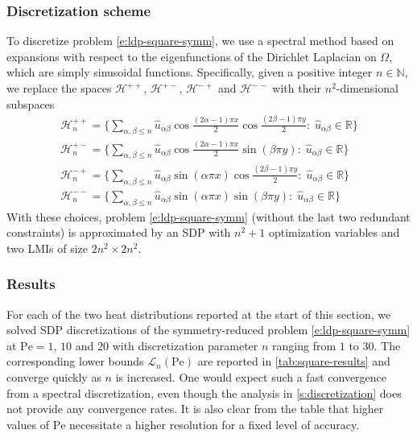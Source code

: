 \documentclass[a4paper, 10pt]{amsart}
\numberwithin{equation}{section}
\theoremstyle{plain}
\theoremstyle{definition}
\theoremstyle{remark}
\newcommand{\cal}[1]{\mathcal{#1}}
\newcommand{\R}{\mathbb{R}}
\newcommand{\N}{\mathbb{N}}
\newcommand{\Pe}{\mathrm{Pe}}
\newcommand{\Hpp}{\cal{H}^{++}}
\newcommand{\Hpm}{\cal{H}^{+-}}
\newcommand{\Hmp}{\cal{H}^{-+}}
\newcommand{\Hmm}{\cal{H}^{--}}
\newcommand{\lb}{\mathcal{L}}
\begin{document}
\subsubsection{Discretization scheme}
To discretize problem \cref{e:ldp-square-symm}, we use a spectral method based on expansions with respect to the eigenfunctions of the Dirichlet Laplacian on $\Omega$, which are simply sinusoidal functions. Specifically, given a positive integer $n\in \N$, we replace the spaces $\Hpp$, $\Hpm$, $\Hmp$ and $\Hmm$ with their $n^2$-dimensional subspaces
\begin{gather*}
    \Hpp_n = \bigg\{
        \sum_{\alpha,\beta\leq n} 
            \hat{u}_{\alpha\beta}
            \cos\tfrac{(2\alpha-1) \pi x}{2}
            \cos\tfrac{(2\beta-1) \pi y}{2}
            :\; \hat{u}_{\alpha\beta} \in \R
        \bigg\}
    \\
    \Hpm_n = \bigg\{
        \sum_{\alpha,\beta\leq n} 
            \hat{u}_{\alpha\beta}
            \cos\tfrac{(2\alpha-1) \pi x}{2}
            \sin\left(\beta \pi y\right)
            :\; \hat{u}_{\alpha\beta} \in \R
        \bigg\}
    \\
    \Hmp_n = \bigg\{
        \sum_{\alpha,\beta\leq n} 
            \hat{u}_{\alpha\beta}
            \sin\left(\alpha \pi x\right)
            \cos\tfrac{(2\beta-1) \pi y}{2}
            :\; \hat{u}_{\alpha\beta} \in \R
        \bigg\}
    \\
    \Hmm_n = \bigg\{
        \sum_{\alpha,\beta\leq n} 
            \hat{u}_{\alpha\beta}
            \sin\left(\alpha \pi x\right)
            \sin\left(\beta \pi y\right)
            :\; \hat{u}_{\alpha\beta} \in \R
        \bigg\}
\end{gather*}
With these choices, problem \cref{e:ldp-square-symm} (without the last two redundant constraints) is approximated by an SDP with $n^2+1$ optimization variables and two LMIs of size $2n^2 \times 2n^2$.

\subsubsection{Results}
For each of the two heat distributions reported at the start of this section, we solved SDP discretizations of the symmetry-reduced problem \cref{e:ldp-square-symm} at $\Pe=1$, $10$ and $20$ with discretization parameter $n$ ranging from $1$ to $30$. The corresponding lower bounds $\lb_n(\Pe)$ are reported in \cref{tab:square-results} and converge quickly as $n$ is increased. One would expect such a fast convergence from a spectral discretization, even though the analysis in \cref{s:discretization} does not provide any convergence rates. It is also clear from the table that higher values of $\Pe$ necessitate a higher resolution for a fixed level of accuracy.
\end{document}
